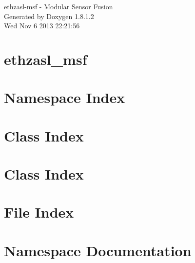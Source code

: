 \documentclass{book}
\begin{document}
\hypersetup{pageanchor=false,citecolor=blue}
\begin{titlepage}
\vspace*{7cm}
\begin{center}
{\Large ethzasl-\/msf -\/ Modular Sensor Fusion }\\
\vspace*{1cm}
{\large Generated by Doxygen 1.8.1.2}\\
\vspace*{0.5cm}
{\small Wed Nov 6 2013 22:21:56}\\
\end{center}
\end{titlepage}
\clearemptydoublepage
{}
\tableofcontents
\clearemptydoublepage
{}
\hypersetup{pageanchor=true,citecolor=blue}
\chapter{ethzasl\-\_\-msf}
\label{index}\hypertarget{index}{}
\chapter{Namespace Index}

\chapter{Class Index}

\chapter{Class Index}

\chapter{File Index}

\chapter{Namespace Documentation}











\end{document}
